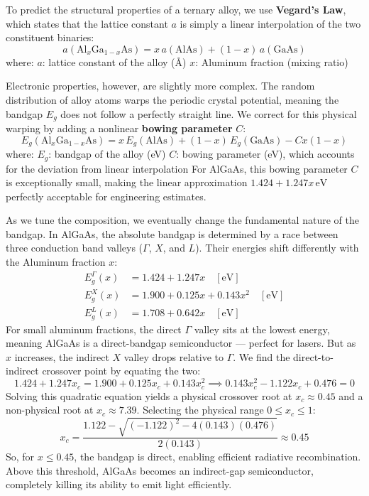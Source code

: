 To predict the structural properties of a ternary alloy, we use \textbf{Vegard's Law}, which states that the lattice constant $a$ is simply a linear interpolation of the two constituent binaries:
\begin{equation*}
    a\!\left(\text{Al}_x\text{Ga}_{1-x}\text{As}\right) = x\,a(\text{AlAs}) + (1-x)\,a(\text{GaAs})
\end{equation*}
where:
$a$: lattice constant of the alloy (\AA)
$x$: Aluminum fraction (mixing ratio)

Electronic properties, however, are slightly more complex. The random distribution of alloy atoms warps the periodic crystal potential, meaning the bandgap $E_g$ does not follow a perfectly straight line. We correct for this physical warping by adding a nonlinear \textbf{bowing parameter} $C$:
\begin{equation*}
    E_g\!\left(\text{Al}_x\text{Ga}_{1-x}\text{As}\right) = x\,E_g(\text{AlAs}) + (1-x)\,E_g(\text{GaAs}) - C x(1-x)
\end{equation*}
where:
$E_g$: bandgap of the alloy (eV)
$C$: bowing parameter (eV), which accounts for the deviation from linear interpolation
For AlGaAs, this bowing parameter $C$ is exceptionally small, making the linear approximation $1.424 + 1.247x\,\text{eV}$ perfectly acceptable for engineering estimates.

As we tune the composition, we eventually change the fundamental nature of the bandgap. In AlGaAs, the absolute bandgap is determined by a race between three conduction band valleys ($\Gamma$, $X$, and $L$). Their energies shift differently with the Aluminum fraction $x$:
\begin{align*}
    E_g^\Gamma(x) &= 1.424 + 1.247x \quad [\text{eV}] \\
    E_g^X(x) &= 1.900 + 0.125x + 0.143x^2 \quad [\text{eV}] \\
    E_g^L(x) &= 1.708 + 0.642x \quad [\text{eV}]
\end{align*}
For small aluminum fractions, the direct $\Gamma$ valley sits at the lowest energy, meaning AlGaAs is a direct-bandgap semiconductor — perfect for lasers. But as $x$ increases, the indirect $X$ valley drops relative to $\Gamma$. We find the direct-to-indirect crossover point by equating the two:
\begin{equation*}
    1.424 + 1.247x_c = 1.900 + 0.125x_c + 0.143x_c^2 \implies 0.143x_c^2 - 1.122x_c + 0.476 = 0
\end{equation*}
Solving this quadratic equation yields a physical crossover root at $x_c \approx 0.45$ and a non-physical root at $x_c \approx 7.39$. Selecting the physical range $0 \le x_c \le 1$:
\begin{equation*}
    x_c = \frac{1.122 - \sqrt{(-1.122)^2 - 4(0.143)(0.476)}}{2(0.143)} \approx 0.45
\end{equation*}
So, for $x \le 0.45$, the bandgap is direct, enabling efficient radiative recombination. Above this threshold, AlGaAs becomes an indirect-gap semiconductor, completely killing its ability to emit light efficiently.


